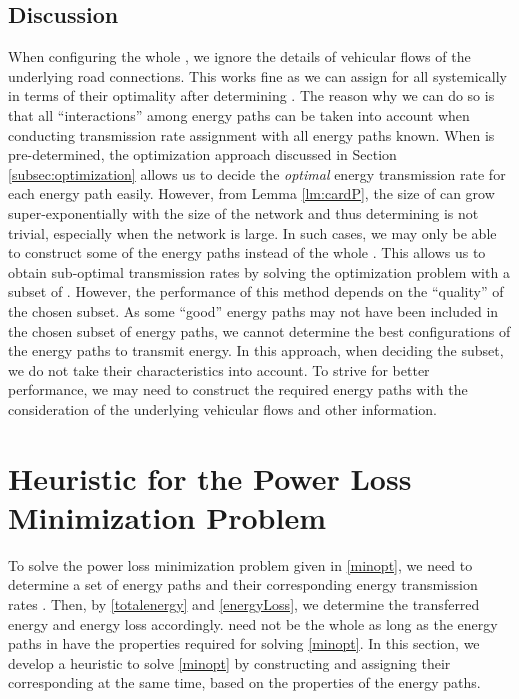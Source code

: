 \documentclass[journal]{IEEEtran}
\begin{document}
\subsection{Discussion}
When configuring the whole , we ignore the details of  vehicular flows of the underlying road connections. This works fine as we can assign  for all  systemically in terms of their optimality after determining . The reason why we can do so is that all ``interactions'' among energy paths can be taken into account when conducting transmission rate assignment with all energy paths known.
When  is pre-determined, the optimization approach discussed in Section \ref{subsec:optimization} allows us to decide the \textit{optimal} energy transmission rate for each energy path easily. 
However,  from Lemma \ref{lm:cardP}, the size of  can grow super-exponentially with the size of the network and thus  determining  is not trivial, especially when the network is large. In such cases, we may only be able to construct some of the energy paths instead of the whole . 
This allows us to obtain sub-optimal transmission rates by solving the optimization problem with a subset of . However, the performance of this method depends on the ``quality'' of the chosen subset. As some ``good'' energy paths may not have been included in the chosen subset of  energy paths, we cannot determine the best configurations of the energy paths to transmit energy. In this approach, when deciding the subset, we do not take their characteristics into account. 
To strive for better performance, we may need to construct the required energy paths with the consideration of the underlying vehicular flows and other information.

\section{Heuristic for the Power Loss Minimization Problem} \label{sec:heuristic}


To solve the power loss minimization problem given in \eqref{minopt}, we need to determine a set of energy paths  and their corresponding energy transmission rates . Then, by \eqref{totalenergy} and \eqref{energyLoss}, we determine the  transferred energy and energy loss accordingly.  need not be the whole  as long as the energy paths in  have the properties required for solving \eqref{minopt}.
In this section,  we develop a heuristic to solve \eqref{minopt} by constructing  and assigning their corresponding  at the same time, based on the properties of the energy paths.
\end{document}
